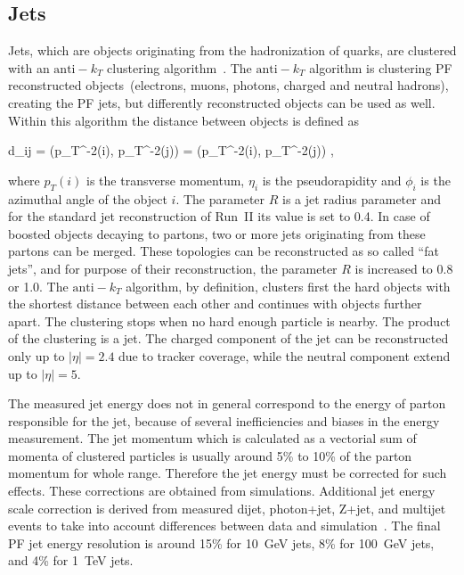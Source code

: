 \subsection{Jets}

Jets, which are objects originating from the hadronization of quarks, are clustered with an $\mathrm{anti-}k_{T}$ clustering algorithm~\cite{Cacciari:2008gp, Cacciari:2011ma}. The $\mathrm{anti-}k_{T}$ algorithm is clustering PF reconstructed objects~(electrons, muons, photons, charged and neutral hadrons), creating the PF jets, but differently reconstructed objects can be used as well. Within this algorithm the distance between objects is defined as

{   
    d_{ij} = ({p_{T}}^{-2}(i), {p_{T}}^{-2}(j))  =  ({p_{T}}^{-2}(i), {p_{T}}^{-2}(j)) ,
}

where $p_{T}(i)$ is the transverse momentum, $\eta_{i}$ is the pseudorapidity and $\phi_{i}$ is the azimuthal angle of the object $i$. The parameter $R$ is a jet radius parameter and for the standard jet reconstruction of Run~II its value is set to 0.4. In case of boosted objects decaying to partons, two or more jets originating from these partons can be merged. These topologies can be reconstructed as so called ``fat jets'', and for purpose of their reconstruction, the parameter $R$ is increased to 0.8 or 1.0. The $\mathrm{anti-}k_{T}$ algorithm, by definition, clusters first the hard objects with the shortest distance between each other and continues with objects further apart. The clustering stops when no hard enough particle is nearby. The product of the clustering is a jet. The charged component of the jet can be reconstructed only up to $|\eta|=2.4$ due to tracker coverage, while the neutral component extend up to  $|\eta|=5$.

The measured jet energy does not in general correspond to the energy of parton responsible for the jet, because of several inefficiencies and biases in the energy measurement. The jet momentum which is calculated as a vectorial sum of momenta of clustered particles is usually around 5\% to 10\% of the parton momentum for whole \pt range. Therefore the jet energy must be corrected for such effects. These corrections are obtained from simulations. Additional jet energy scale correction is derived from measured dijet, photon+jet, Z+jet, and multijet events to take into account differences between data and simulation~\cite{Khachatryan:2016kdb}. The final PF jet energy resolution is around 15\% for 10~GeV jets, 8\% for 100~GeV jets, and 4\% for 1~TeV jets. 

